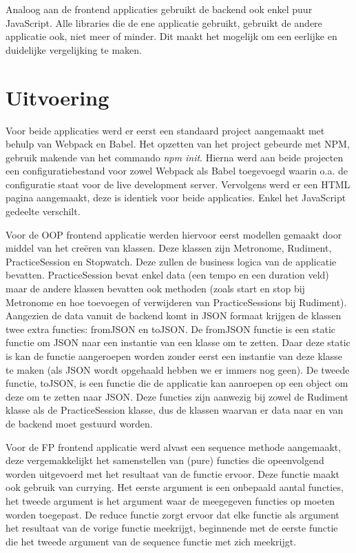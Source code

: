  
 Analoog aan de frontend applicaties gebruikt de backend ook enkel puur JavaScript. Alle libraries die de ene applicatie gebruikt, gebruikt de andere applicatie ook, niet meer of minder. Dit maakt het mogelijk om een eerlijke en duidelijke vergelijking te maken. 

\section{Uitvoering}
Voor beide applicaties werd er eerst een standaard project aangemaakt met behulp van Webpack en Babel. Het opzetten van het project gebeurde met NPM, gebruik makende van het commando \textit{npm init}. Hierna werd aan beide projecten een configuratiebestand voor zowel Webpack als Babel toegevoegd waarin o.a. de configuratie staat voor de live development server. Vervolgens werd er een HTML pagina aangemaakt, deze is identiek voor beide applicaties. Enkel het JavaScript gedeelte verschilt. 

Voor de OOP frontend applicatie werden hiervoor eerst modellen gemaakt door middel van het creëren van klassen. Deze klassen zijn Metronome, Rudiment, PracticeSession en Stopwatch. Deze zullen de business logica van de applicatie bevatten. PracticeSession bevat enkel data (een tempo en een duration veld) maar de andere klassen bevatten ook methoden (zoals start en stop bij Metronome en hoe toevoegen of verwijderen van PracticeSessions bij Rudiment). Aangezien de data vanuit de backend komt in JSON formaat krijgen de klassen twee extra functies: fromJSON en toJSON. De fromJSON functie is een static functie om JSON naar een instantie van een klasse om te zetten. Daar deze static is kan de functie aangeroepen worden zonder eerst een instantie van deze klasse te maken (als JSON wordt opgehaald hebben we er immers nog geen). De tweede functie, toJSON, is een functie die de applicatie kan aanroepen op een object om deze om te zetten naar JSON. Deze functies zijn aanwezig bij zowel de Rudiment klasse als de PracticeSession klasse, dus de klassen waarvan er data naar en van de backend moet gestuurd worden. 

Voor de FP frontend applicatie werd alvast een sequence methode aangemaakt, deze vergemakkelijkt het samenstellen van (pure) functies die opeenvolgend worden uitgevoerd met het resultaat van de functie ervoor. Deze functie maakt ook gebruik van currying. Het eerste argument is een onbepaald aantal functies, het tweede argument is het argument waar de meegegeven functies op moeten worden toegepast. De reduce functie zorgt ervoor dat elke functie als argument het resultaat van de vorige functie meekrijgt, beginnende met de eerste functie die het tweede argument van de sequence functie met zich meekrijgt.

